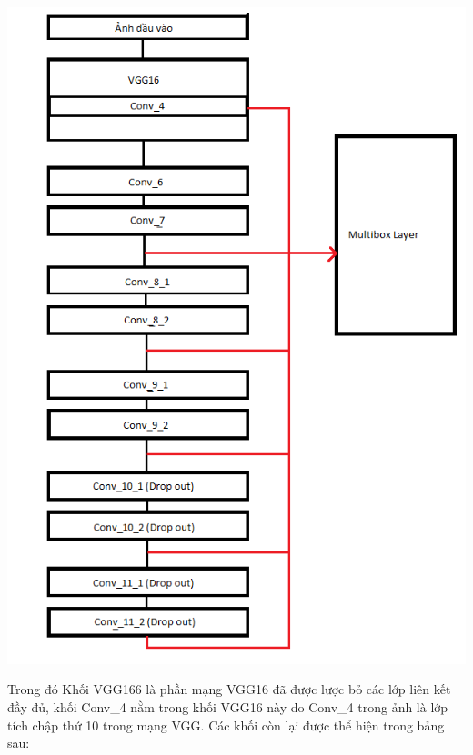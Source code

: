 \documentclass[a4paper,12pt]{article}
\begin{document}
	\begin{center}
		
		\centering
		\includegraphics[width=0.8\linewidth]{SSD_Layers.png}
		\vspace{0.5cm}
	\end{center}
	
	Trong đó Khối VGG166 là phần mạng VGG16\cite{simonyan2014very} đã được lược bỏ các lớp liên kết đầy đủ, khối Conv\_4 nằm trong khối VGG16 này do Conv\_4 trong ảnh là lớp tích chập thứ 10 trong mạng VGG\cite{simonyan2014very}. Các khối còn lại được thể hiện trong bảng sau:
	
\end{document}
